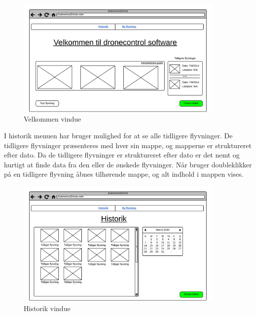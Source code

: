 \vspace{-5pt}
 \begin{figure}[H]
 	\centering
 	\includegraphics[width=0.9\textwidth]{Billeder/UI_mockups/index.png}
 	\vspace{-5pt}
 	\caption{Velkommen vindue}
 	\label{fig:mockup_welcome}
 \end{figure} 

\vspace{1cm}

I historik menuen har bruger mulighed for at se alle tidligere flyvninger. De tidligere flyvninger præsenteres med hver sin mappe, og mapperne er struktureret efter dato. Da de tidligere flyvninger er struktureret efter dato er det nemt og hurtigt at finde data fra den eller de ønskede flyvninger. Når bruger doubleklikker på en tidligere flyvning åbnes tilhørende mappe, og alt indhold i mappen vises.

\vspace{-5pt}
\begin{figure}[H]
	\centering
	\includegraphics[width=0.9\textwidth]{Billeder/UI_mockups/archive.png}
	\vspace{-5pt}
	\caption{Historik vindue}
	\label{fig:mockup_archive}
\end{figure}

